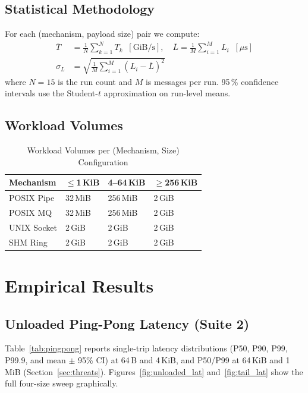 \documentclass[10pt,conference]{IEEEtran}
\begin{document}
\subsection{Statistical Methodology}

For each (mechanism, payload size) pair we compute:
\begin{align*}
  \bar{T} &= \frac{1}{N}\sum_{k=1}^{N} T_k \;\;[\text{GiB/s}], \quad
  \bar{L} = \frac{1}{M}\sum_{i=1}^{M} L_i \;\;[\mu\text{s}] \\
  \sigma_L &= \sqrt{\frac{1}{M}\sum_{i=1}^{M} (L_i - \bar{L})^2}
\end{align*}
where $N=15$ is the run count and $M$ is messages per run.  95\,\% confidence
intervals use the Student-$t$ approximation on run-level means.

\subsection{Workload Volumes}

\begin{table}[H]
  \centering
  \caption{Workload Volumes per (Mechanism, Size) Configuration}
  \label{tab:volumes}
  \small
  \begin{tabular}{@{}L{2.4cm}L{1.7cm}L{1.7cm}L{1.7cm}@{}}
    \toprule
    \textbf{Mechanism} & \textbf{$\leq$1\,KiB} & \textbf{4--64\,KiB} & \textbf{$\geq$256\,KiB} \\
    \midrule
    POSIX Pipe   & 32\,MiB  & 256\,MiB & 2\,GiB \\
    POSIX MQ     & 32\,MiB  & 256\,MiB & 2\,GiB \\
    UNIX Socket  & 2\,GiB   & 2\,GiB   & 2\,GiB \\
    SHM Ring     & 2\,GiB   & 2\,GiB   & 2\,GiB \\
    \bottomrule
  \end{tabular}
\end{table}

\section{Empirical Results}

\subsection{Unloaded Ping-Pong Latency (Suite 2)}

Table~\ref{tab:pingpong} reports single-trip latency distributions (P50, P90, P99, P99.9, and mean $\pm$ 95\% CI) at 64\,B and 4\,KiB, and P50/P99 at 64\,KiB and 1\,MiB (Section~\ref{sec:threats}). Figures~\ref{fig:unloaded_lat} and~\ref{fig:tail_lat} show the full four-size sweep graphically.
\end{document}

